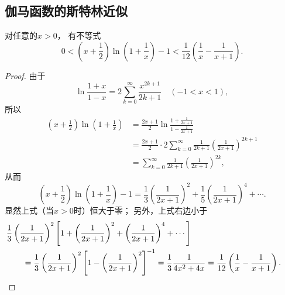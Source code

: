 \subsection{伽马函数的斯特林近似}
\begin{lemma}\label{theorem:定积分.伽马函数的斯特灵近似.引理1}
对任意的\(x>0\)，
有不等式\begin{equation}\label{equation:定积分.伽马函数的斯特灵近似.引理1}
	0 < \left(x+\frac{1}{2}\right) \ln(1+\frac{1}{x}) - 1
	< \frac{1}{12}\left(\frac{1}{x}-\frac{1}{x+1}\right).
\end{equation}
\begin{proof}
由于\[
	\ln\frac{1+x}{1-x}
	= 2 \sum_{k=0}^\infty \frac{x^{2k+1}}{2k+1}
	\quad(-1<x<1),
\]
所以\begin{align*}
	\left(x+\frac{1}{2}\right) \ln(1+\frac{1}{x})
	&= \frac{2x+1}{2} \ln\frac{
		1+\frac{1}{2x+1}
	}{
		1-\frac{1}{2x+1}
	} \\
	&= \frac{2x+1}{2} \cdot
	2 \sum_{k=0}^\infty \frac{1}{2k+1} \left(\frac{1}{2x+1}\right)^{2k+1} \\
	&= \sum_{k=0}^\infty \frac{1}{2k+1} \left(\frac{1}{2x+1}\right)^{2k},
\end{align*}
从而\[
	\left(x+\frac{1}{2}\right) \ln(1+\frac{1}{x}) - 1
	= \frac{1}{3} \left(\frac{1}{2x+1}\right)^2
	+ \frac{1}{5} \left(\frac{1}{2x+1}\right)^4
	+ \dotsb.
\]
显然上式（当\(x>0\)时）恒大于零；
另外，上式右边小于\begin{align*}
	&\hspace{-20pt}
	\frac{1}{3} \left(\frac{1}{2x+1}\right)^2 \left[
	1 + \left(\frac{1}{2x+1}\right)^2 + \left(\frac{1}{2x+1}\right)^4 + \dotsb
	\right] \\
	&= \frac{1}{3} \left(\frac{1}{2x+1}\right)^2 \left[
	1 - \left(\frac{1}{2x+1}\right)^2
	\right]^{-1}
	= \frac{1}{3} \frac{1}{4x^2 + 4x}
	= \frac{1}{12} \left(\frac{1}{x} - \frac{1}{x+1}\right).
	\qedhere
\end{align*}
\end{proof}
\end{lemma}

